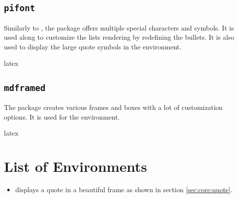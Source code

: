 \documentclass{report}
\begin{document}
\subsection{\texttt{pifont}}
Similarly to , the  package offers multiple special characters and symbols. It is used along  to customize the lists rendering by redefining the bullets. It is also used to display the large quote symbols in the  environment.

\begin{imtaCode}{latex}
    \RequirePackage{pifont}
\end{imtaCode}


\subsection{\texttt{mdframed}}
The  package creates various frames and boxes with a lot of customization options. It is used for the  environment.

\begin{imtaCode}{latex}
    \RequirePackage{mdframed}
\end{imtaCode}



\section{List of Environments}
\begin{itemize}
    \item {} displays a quote in a beautiful frame as shown in section \ref{sec:core:quote}.
\end{itemize}


\end{document}
